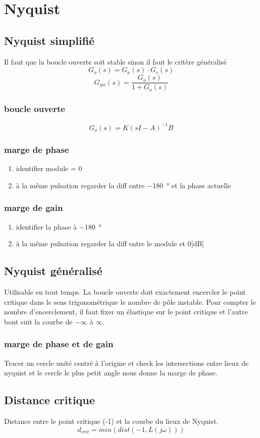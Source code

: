 \documentclass[resume]{subfiles}
\begin{document}
\section{Nyquist}

\subsection{Nyquist simplifié}
Il faut que la boucle ouverte soit stable sinon il faut le critère généralisé
$$G_o(s) = G_a(s)\cdot G_c(s)$$
$$G_{yw}(s)=\frac{G_o(s)}{1+G_o(s)}$$

\subsubsection{boucle ouverte}
$$G_o(s) = K(sI - A)^{-1}B$$

\subsubsection{marge de phase}
\begin{enumerate}
\item identifier module = 0
\item à la même pulsation regarder la diff entre \SI{-180}{\degree} et la phase actuelle
\end{enumerate}

\subsubsection{marge de gain}
\begin{enumerate}
\item identifier la phase à \SI{-180}{\degree}
\item à la même pulsation regarder la diff entre le module et 0[dB]
\end{enumerate}

\subsection{Nyquist généralisé}
Utilisable en tout temps. La boucle ouverte doit exactement encercler le point critique dans le sens trigonométrique le nombre de pôle instable.
Pour compter le nombre d'encerclement, il faut fixer un élastique sur le point critique et l'autre bout suit la courbe de $-\infty$ à $\infty$. 

\subsubsection{marge de phase et de gain}
Tracer un cercle unité centré à l'origine et check les intersections entre lieux de nyquist et le cercle le plus petit angle nous donne la marge de phase.


\subsection{Distance critique}
Distance entre le point critique (-1) et la courbe du lieux de Nyquist.
$$d_{crit} = min(dist(-1,L(j\omega)))$$
\end{document}
